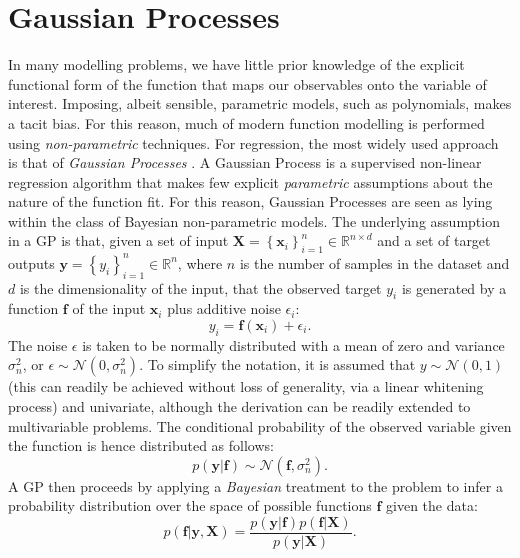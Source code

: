 \documentclass[useAMS,usenatbib,fleqn]{mn2e}
\begin{document}
\section{Gaussian Processes}
\label{sec-gaussian-process}
In many modelling problems, we have little prior knowledge of the explicit functional form of the function that maps our observables onto the variable of interest. Imposing, albeit sensible, parametric models, such as polynomials, makes a tacit bias. For this reason, much of modern function modelling is performed using \emph{non-parametric} techniques. For regression, the most widely used approach is that of \emph{Gaussian Processes} \citep{rasmussen2006gaussian}.
A Gaussian Process is a supervised non-linear regression algorithm that makes few explicit \emph{parametric} assumptions about the nature of the function fit. For this reason, Gaussian Processes are seen as lying within the class of Bayesian non-parametric models. The underlying assumption in a GP is that, given a set of input $\mathbf{X}=\left\{\mathbf{x}_{i}\right\}_{i=1}^{n}\in \mathbb{R}^{n\times d}$ and a set of target outputs $\mathbf{y}=\left\{y_{i}\right\}_{i=1}^{n}\in \mathbb{R}^{n}$, where $n$ is the number of samples in the dataset and $d$ is the dimensionality of the input, that the observed target $y_{i}$ is generated by a function $\mathbf{f}$ of the input $\mathbf{x}_{i}$ plus additive noise $\epsilon_{i}$:
\begin{equation}
y_{i} = \mathbf{f}\left(\mathbf{x}_{i}\right)+\epsilon_{i}.
\end{equation}
The noise $\epsilon$ is taken to be normally distributed with a mean of zero and variance $\sigma_{n}^{2}$, or $\epsilon\sim\mathcal{N} \left(0,\sigma_{n}^{2}\right)$. To simplify the notation, it is assumed that $y\sim\mathcal{N} \left(0,1\right)$ (this can readily be achieved without loss of generality, via a linear whitening process) and univariate, although the derivation can be readily extended to multivariable problems. The conditional probability of the observed variable given the function is hence distributed as follows:
\begin{equation}
p\left(\mathbf{y}|\mathbf{f}\right)\sim\mathcal{N} \left(\mathbf{f},\sigma_{n}^{2}\right).
\end{equation}
A GP then proceeds by applying a \emph{Bayesian} treatment to the problem to infer a probability distribution over the space of possible functions $\mathbf{f}$ given the data:
\begin{equation}
p\left(\mathbf{f}|\mathbf{y},\mathbf{X}\right) = \frac{p\left(\mathbf{y}|\mathbf{f}\right)p\left(\mathbf{f}|\mathbf{X}\right)}{p\left(\mathbf{y}|\mathbf{X}\right)}.
\end{equation}
\end{document}
